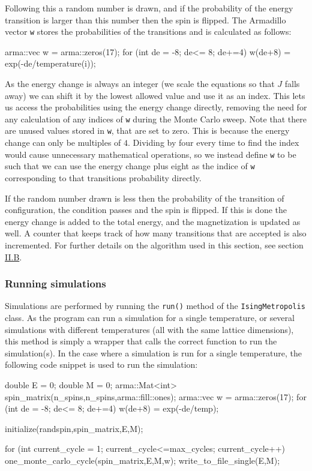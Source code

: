 \documentclass[reprint,english,notitlepage]{revtex4-1}  %
\begin{document}
Following this a random number is drawn, and if the probability of the energy transition is larger than this number then the spin is flipped. The Armadillo \citep{Armadillo} vector \verb+w+ stores the probabilities of the transitions and is calculated as follows:

\begin{cpp}
arma::vec w = arma::zeros(17);
for (int de = -8; de<= 8; de+=4) {
  w(de+8) = exp(-de/temperature(i));
}
\end{cpp} 

As the energy change is always an integer (we scale the equations so that $J$ falls away) we can shift it by the lowest allowed value and use it as an index. This lets us access the probabilities using the energy change directly, removing the need for any calculation of any indices of \verb+w+ during the Monte Carlo sweep. Note that there are unused values stored in \verb+w+, that are set to zero. This is because the energy change can only be multiples of $4$. Dividing by four every time to find the index would cause unnecessary mathematical operations, so we instead define \verb+w+ to be such that we can use the energy change plus eight as the indice of \verb+w+ corresponding to that transitions probability directly.

If the random number drawn is less then the probability of the transition of configuration, the condition passes and the spin is flipped. If this is done the energy change is added to the total energy, and the magnetization is updated as well. A counter that keeps track of how many transitions that are accepted is also incremented. For further details on the algorithm used in this section, see section \hyperref[sec:II:b]{II.B}. 


\subsubsection{Running simulations} \label{sec:III:a:iii}

Simulations are performed by running the \verb+run()+ method of the \verb+IsingMetropolis+ class. As the program can run a simulation for a single temperature, or several simulations with different temperatures (all with the same lattice dimensions), this method is simply a wrapper that calls the correct function to run the simulation(s). In the case where a simulation is run for a single temperature, the following code snippet is used to run the simulation:

\begin{cpp}
double E = 0;
double M = 0;
arma::Mat<int> spin_matrix(n_spins,n_spins,arma::fill::ones);
arma::vec w = arma::zeros(17);
for (int de = -8; de<= 8; de+=4) {
  w(de+8) = exp(-de/temp);
}

initialize(randspin,spin_matrix,E,M);

for (int current_cycle = 1; current_cycle<=max_cycles; 
	 current_cycle++){
  one_monte_carlo_cycle(spin_matrix,E,M,w);
  write_to_file_single(E,M);
}
\end{cpp}
\end{document}
